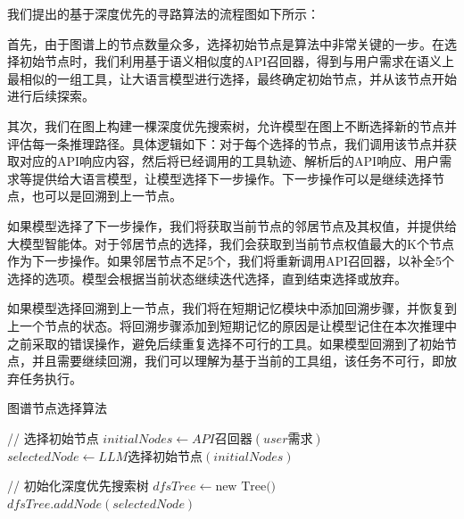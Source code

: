 我们提出的基于深度优先的寻路算法的流程图如下所示：

首先，由于图谱上的节点数量众多，选择初始节点是算法中非常关键的一步。在选择初始节点时，我们利用基于语义相似度的API召回器，得到与用户需求在语义上最相似的一组工具，让大语言模型进行选择，最终确定初始节点，并从该节点开始进行后续探索。

其次，我们在图上构建一棵深度优先搜索树，允许模型在图上不断选择新的节点并评估每一条推理路径。具体逻辑如下：对于每个选择的节点，我们调用该节点并获取对应的API响应内容，然后将已经调用的工具轨迹、解析后的API响应、用户需求等提供给大语言模型，让模型选择下一步操作。下一步操作可以是继续选择节点，也可以是回溯到上一节点。

如果模型选择了下一步操作，我们将获取当前节点的邻居节点及其权值，并提供给大模型智能体。对于邻居节点的选择，我们会获取到当前节点权值最大的K个节点作为下一步操作。如果邻居节点不足5个，我们将重新调用API召回器，以补全5个选择的选项。模型会根据当前状态继续迭代选择，直到结束选择或放弃。

如果模型选择回溯到上一节点，我们将在短期记忆模块中添加回溯步骤，并恢复到上一个节点的状态。将回溯步骤添加到短期记忆的原因是让模型记住在本次推理中之前采取的错误操作，避免后续重复选择不可行的工具。如果模型回溯到了初始节点，并且需要继续回溯，我们可以理解为基于当前的工具组，该任务不可行，即放弃任务执行。

\begin{algorithm}[htb]
    \caption{图谱节点选择算法}
    \label{algo:algorithm}
    \small
    \SetAlgoLined
  
    // 选择初始节点\;
    $initi
    alNodes \gets API召回器(user需求)$\;
    $selectedNode \gets LLM选择初始节点(initialNodes)$\;
    
    // 初始化深度优先搜索树\;
    $dfsTree \gets \text{new Tree()}$\;
    $dfsTree.addNode(selectedNode)$\;
  
  \end{algorithm}

